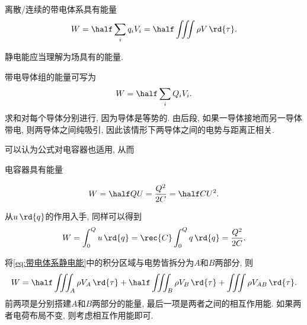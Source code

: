 \documentclass[../Electromagnetism.tex]{subfiles}
\begin{document}
\begin{finale}
	\begin{corollary}[带电体系静电能]
		离散/连续的带电体系具有能量
		\begin{equation}
			\label{eq:带电体系静电能}
			W = \half \sum_i q_i V_i = \half \iiint \rho V\,\rd{\tau}.
		\end{equation}
	\end{corollary}
\end{finale}
\begin{remark}
	静电能应当理解为场具有的能量.
\end{remark}
\begin{ex}
	带电导体组的能量可写为
	\[ W = \half \sum_i Q_i V_i. \]
	求和对每个导体分别进行, 因为导体是等势的. 由后段, 如果一导体接地而另一导体带电, 则两导体之间纯吸引, 因此该情形下两导体之间的电势与距离正相关.
\end{ex}
可以认为公式对电容器也适用, 从而
\begin{corollary}[电容器的能量]
	电容器具有能量
	\begin{finale}
		\begin{equation}
			\label{eq:电容器场能}
			W = \half QU = \frac{Q^2}{2C} = \half CU^2.
		\end{equation}
	\end{finale}
\end{corollary}
\begin{remark}
	从$u\,\rd{q}$的作用入手, 同样可以得到
	\begin{equation}
		\label{eq:电容器场能的历史推导}
		W = \int_0^Q u\,\rd{q} = \rec{C}\int_0^Q q\,\rd{q} = \frac{Q^2}{2C}.
	\end{equation}
\end{remark}
\begin{remark}
	将\eqref{eq:带电体系静电能}中的积分区域与电势皆拆分为$A$和$B$两部分, 则
	\[ W = \half \iiint_A \rho V_A \,\rd{\tau} + \half \iiint_B \rho V_B \,\rd{\tau} + \iiint \rho V_{AB} \,\rd{\tau}. \]
	前两项是分别搭建$A$和$B$两部分的能量, 最后一项是两者之间的相互作用能. 如果两者电荷布局不变, 则考虑相互作用能即可.
\end{remark}



\end{document}
